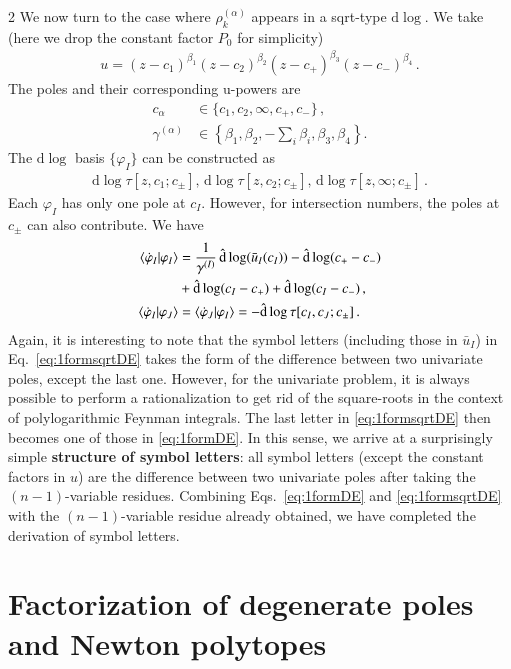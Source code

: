 \documentclass[fleqn]{2023SCGE}
\newcommand{\nn}{\nonumber}
\newcommand{\nd}{\mathrm{d}}
\newcommand{\nds}{\hat{\mathrm{d}}}
\begin{document}
\begin{multicols}{2}
We now turn to the case where $\rho_k^{(\alpha)}$ appears in a sqrt-type $\nd\log$. We take (here we drop the constant factor $P_0$ for simplicity)
\begin{align}
	u=(z-c_1)^{\beta_1} (z-c_2)^{\beta_2} (z-c_+)^{\beta_3}
	(z-c_-)^{\beta_4} \,.
\end{align}
The poles and their corresponding u-powers are
\begin{align}
    c_{\alpha} &\in \{c_1,c_2,\infty,c_+,c_-\} \,,\nn
    \\
    \gamma^{(\alpha)} &\in \left\{ \beta_1,\beta_2,-\sum_i \beta_i,\beta_3,\beta_4 \right\} .
\end{align}
The $\nd \log$ basis $\{\varphi_I\}$ can be constructed as
\begin{align}
    \nd \log \tau[z,c_1;c_{\pm}], \, \nd \log \tau[z,c_2;c_{\pm}], \, \nd \log \tau[z,\infty;c_{\pm}] \,.
\end{align}
Each $\varphi_I$ has only one pole at $c_I$. However, for intersection numbers, the poles at $c_\pm$ can also contribute. We have
\begin{align}
    \braket{\dot{\varphi}_I|\varphi_I} &= \frac{1}{\gamma^{(I)}} \, \nds\log (\bar{u}_I(c_I)) - \nds\log(c_+-c_-) \nn
    \\
    &+ \nds\log (c_I-c_+) + \nds\log (c_I-c_-) \,, \nn
    \\
	\braket{\dot{\varphi}_I|\varphi_J} &= \braket{\dot{\varphi}_J|\varphi_I} = -\nds \log \tau[c_I,c_J;c_\pm] \,. \label{eq:1formsqrtDE}
\end{align}
Again, it is interesting to note that the symbol letters (including those in $\bar{u}_I$) in Eq.~\eqref{eq:1formsqrtDE} takes the form of the difference between two univariate poles, except the last one. However, for the univariate problem, it is always possible to perform a rationalization to get rid of the square-roots in the context of polylogarithmic Feynman integrals. The last letter in \eqref{eq:1formsqrtDE} then becomes one of those in \eqref{eq:1formDE}. In this sense, we arrive at a surprisingly simple \textbf{structure of symbol letters}: all symbol letters (except the constant factors in $u$) are the difference between two univariate poles after taking the $(n-1)$-variable residues.
Combining Eqs.~\eqref{eq:1formDE} and \eqref{eq:1formsqrtDE} with the $(n-1)$-variable residue already obtained, we have completed the derivation of symbol letters.


\section{Factorization of degenerate poles and Newton polytopes}
\label{sec:fac}


\end{multicols}
\end{document}
